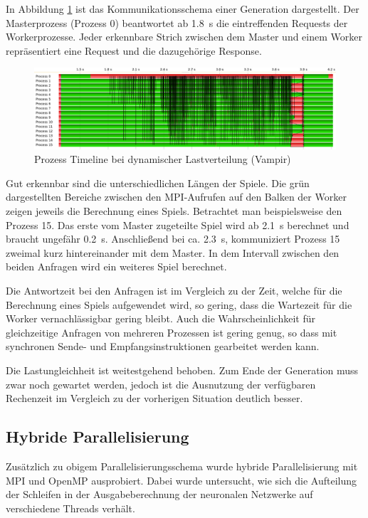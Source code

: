 In Abbildung \ref{fig:vampir_dynamic} ist das Kommunikationsschema einer
Generation dargestellt. Der Masterprozess (Prozess 0) beantwortet ab
\SI{1,8}{\second} die eintreffenden Requests der Workerprozesse. Jeder
erkennbare Strich zwischen dem Master und einem Worker repräsentiert eine
Request und die dazugehörige Response.

\begin{figure}
    \centering
    \includegraphics[width=\textwidth]
        {content/img/vampir_dynamic.png}
        \caption{Prozess Timeline bei dynamischer Lastverteilung (Vampir)}
    \label{fig:vampir_dynamic}
\end{figure}

Gut erkennbar sind die unterschiedlichen Längen der Spiele. Die grün
dargestellten Bereiche zwischen den MPI-Aufrufen auf den Balken der Worker
zeigen jeweils die Berechnung eines Spiels. Betrachtet man beispielsweise den
Prozess 15. Das erste vom Master zugeteilte Spiel wird ab \SI{2,1}{\second}
berechnet und braucht ungefähr \SI{0,2}{\second}. Anschließend bei ca.
\SI{2,3}{\second}, kommuniziert Prozess 15 zweimal kurz hintereinander mit dem
Master. In dem Intervall zwischen den beiden Anfragen wird ein weiteres Spiel
berechnet.

Die Antwortzeit bei den Anfragen ist im Vergleich zu der Zeit, welche für die
Berechnung eines Spiels aufgewendet wird, so gering, dass die Wartezeit für die
Worker vernachlässigbar gering bleibt. Auch die Wahrscheinlichkeit für
gleichzeitige Anfragen von mehreren Prozessen ist gering genug, so dass mit
synchronen Sende- und Empfangsinstruktionen gearbeitet werden kann.

Die Lastungleichheit ist weitestgehend behoben. Zum Ende der Generation muss
zwar noch gewartet werden, jedoch ist die Ausnutzung der verfügbaren Rechenzeit
im Vergleich zu der vorherigen Situation deutlich besser.

\subsection{Hybride Parallelisierung}
Zusätzlich zu obigem Parallelisierungsschema wurde hybride Parallelisierung mit
MPI und OpenMP ausprobiert.  Dabei wurde untersucht, wie sich die Aufteilung
der Schleifen in der Ausgabeberechnung der neuronalen Netzwerke auf
verschiedene Threads verhält.

